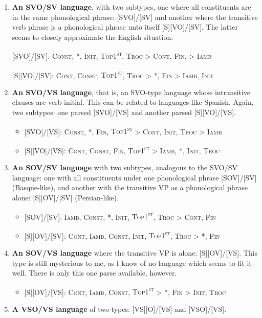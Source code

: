 \documentclass{article}
\newcommand{\cont}{\textsc{Cont}}
\newcommand{\iamb}{\textsc{Iamb}}
\newcommand{\cons}{\textsc{Const}}
\newcommand{\topf}{\textsc{Top1\textsuperscript{st}}}
\newcommand{\nophi}{\textsc{*\textphi}}
\newcommand{\finphi}{\textsc{Fin\textphi}}
\newcommand{\initphi}{\textsc{Init\textphi}}
\newcommand{\troc}{\textsc{Troc}}
\begin{document}
\begin{enumerate}
\item \textbf{An SVO/SV language}, with two subtypes, one where all constituents are in the same phonological phrase: [SVO]/[SV] and another where the transitive verb phrase is a phonological phrase unto itself [S][VO]/[SV].
	The latter seems to closely approximate the English situation.

[SVO]/[SV]: \cons, \nophi, \initphi, \topf, {\troc} {\textgreater} \cont, {\finphi,} {\textgreater} \iamb

[S][VO]/[SV]: \cont, \cons, \topf, {\troc} {\textgreater} \nophi, {\finphi} {\textgreater} \iamb, \initphi
\item \textbf{An SVO/VS language}, that is, an SVO-type language whose intransitive clauses are verb-initial.
	This can be related to languages like Spanish.
		Again, two subtypes: one parsed [SVO]/[VS] and another parsed [S][VO]/[VS].

\begin{itemize}
\item {}[SVO]/[VS]: \cons, \nophi, \finphi, {\topf} {\textgreater} \cont, \initphi, {\troc} {\textgreater} \iamb
\item {}[S][VO]/[VS]: \cont, \cons, \finphi, {\topf} {\textgreater} \iamb, \nophi, \initphi, \troc
\end{itemize}
\item \textbf{An SOV/SV language} with two subtypes, analogous to the SVO/SV language: one with all constituents under one phonological phrase [SOV]/[SV] (Basque-like), and another with the transitive VP as a phonological phrase alone: [S][OV]/[SV] (Persian-like).

\begin{itemize}
\item {}[SOV]/[SV]: \iamb, \cons, \nophi, \initphi, \topf, {\troc} {\textgreater} \cont, \finphi
\item {} [S][OV]/[SV]: \cont, \iamb, \cons, \initphi, \topf, {\troc} {\textgreater} \nophi, \finphi
\end{itemize}
\item \textbf{An SOV/VS language} where the transitive VP is alone: [S][OV]/[VS].
	This type is still mysterious to me, as I know of no language which seems to fit it well. There is only this one parse available, however.

\begin{itemize}
\item {} [S][OV]/[VS]: \cont, \iamb, \cons, {\topf} {\textgreater} \nophi, {\finphi} {\textgreater} \initphi, \troc
\end{itemize}
\item \textbf{A VSO/VS language} of two types: [VS][O]/[VS] and [VSO]/[VS].


\end{enumerate}
\end{document}
